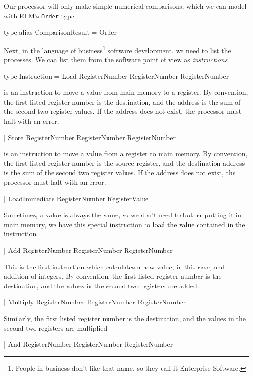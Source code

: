 \documentclass[12pt]{amsbook}
\begin{document}
{Our processor will only make simple numerical comparisons,
which we can model with ELM's \texttt{Order} type
\begin{code}
type alias ComparisonResult = Order
\end{code}

\medskip
Next, in the language of business\footnote{People in business don't like that name, so they call it Enterprise Software.} software development,
we need to list the processes.
We can list them from the software point of view as
\emph{instructions}
\begin{code}
type Instruction  = Load           RegisterNumber RegisterNumber RegisterNumber
\end{code}
is an instruction to move a value from main memory to a register.  
By convention, the first listed register number is the destination, and the address is the sum of the second two register values.  If the address does not exist, the processor must halt with an error.
\begin{code}
                  | Store          RegisterNumber RegisterNumber RegisterNumber
\end{code}
is an instruction to move a value from a register to main memory.
By convention, the first listed register number is the source register, and the destination address is the sum of the second two register values.  If the address does not exist, the processor must halt with an error.
\begin{code}
                  | LoadImmediate  RegisterNumber RegisterValue
\end{code}
Sometimes, a value is always the same, so we don't need to bother putting it in main memory,
we have this special instruction to load the value contained in the instruction.
\begin{code}
                  | Add            RegisterNumber RegisterNumber RegisterNumber
\end{code}
This is the first instruction which calculates a new value, in this case, and addition of integers.
By convention, the first listed register number is the destination, and the values in the second two registers are added.
\begin{code}
                  | Multiply       RegisterNumber RegisterNumber RegisterNumber
\end{code}
Similarly, the first listed register number is the destination, and the values in the second two registers are multiplied.
\begin{code}
                  | And            RegisterNumber RegisterNumber RegisterNumber

\end{code}}
\end{document}
